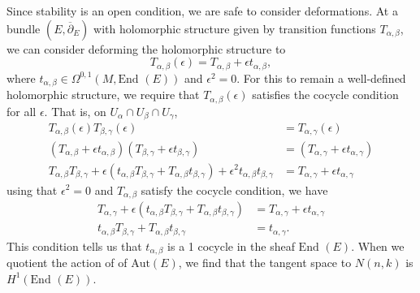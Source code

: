 \documentclass[]{article}
\newcommand{\End}{\text{End }}
\newcommand{\dbar}{\overline{\partial}}
\begin{document}
	Since stability is an open condition, we are safe to consider deformations. At a bundle $(E,\dbar_E)$ with holomorphic structure given by transition functions $T_{\alpha,\beta}$, we can consider deforming the holomorphic structure to 
	\begin{equation}
		T_{\alpha,\beta}(\epsilon) = T_{\alpha,\beta} + \epsilon t_{\alpha,\beta},
	\end{equation}
	where $t_{\alpha,\beta} \in \Omega^{0,1}(M,\End(E))$ and $\epsilon^2=0$. For this to remain a well-defined holomorphic structure, we require that $T_{\alpha,\beta}(\epsilon)$ satisfies the cocycle condition for all $\epsilon$. That is, on $U_{\alpha}\cap U_{\beta}\cap U_{\gamma}$,
	\begin{align*}
		T_{\alpha,\beta}(\epsilon)T_{\beta,\gamma}(\epsilon) &= T_{\alpha,\gamma}(\epsilon)\\
		\left(T_{\alpha,\beta} + \epsilon t_{\alpha,\beta} \right)
		\left(T_{\beta,\gamma} + \epsilon t_{\beta,\gamma} \right) &=
		\left(T_{\alpha,\gamma} + \epsilon t_{\alpha,\gamma} \right)\\
		T_{\alpha,\beta}T_{\beta,\gamma} + \epsilon(t_{\alpha,\beta}T_{\beta,\gamma} + T_{\alpha,\beta} t_{\beta,\gamma}) + \epsilon^2 t_{\alpha,\beta}t_{\beta,\gamma} &= T_{\alpha,\gamma} + \epsilon t_{\alpha,\gamma}
	\end{align*}
	using that $\epsilon^2 = 0$ and $T_{\alpha,\beta}$ satisfy the cocycle condition, we have
	\begin{align*}
		T_{\alpha,\gamma} + \epsilon(t_{\alpha,\beta} T_{\beta,\gamma} + T_{\alpha,\beta} t_{\beta,\gamma}) &= T_{\alpha,\gamma} + \epsilon t_{\alpha,\gamma}\\
		t_{\alpha,\beta} T_{\beta,\gamma} + T_{\alpha,\beta} t_{\beta,\gamma} &= t_{\alpha,\gamma}.
	\end{align*}
	This condition tells us that $t_{\alpha,\beta}$ is a 1 cocycle in the sheaf $\End(E)$. When we quotient the action of of $\text{Aut}(E)$, we find that the tangent space to $N(n,k)$ is $H^1(\End(E))$. 
	
\end{document}
